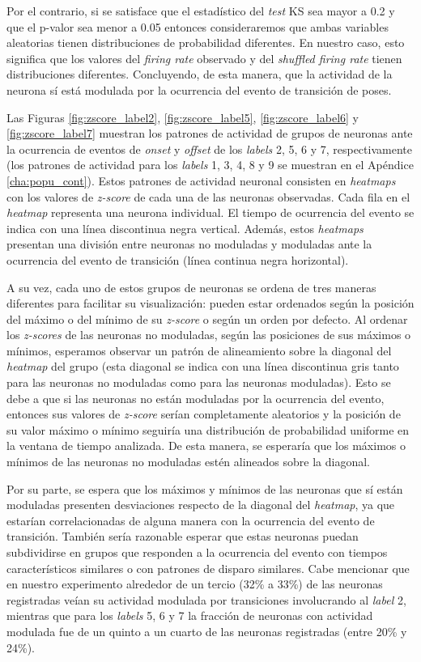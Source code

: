 Por el contrario, si se satisface que el estadístico del \textit{test} KS sea mayor a 0.2 y que el p-valor sea menor a 0.05 entonces consideraremos que ambas variables aleatorias tienen distribuciones de probabilidad diferentes. En nuestro caso, esto significa que los valores del \textit{firing rate} observado y del \textit{shuffled firing rate} tienen distribuciones diferentes. Concluyendo, de esta manera, que la actividad de la neurona sí está modulada por la ocurrencia del evento de transición de poses.

Las Figuras \ref{fig:zscore_label2}, \ref{fig:zscore_label5}, \ref{fig:zscore_label6} y \ref{fig:zscore_label7} muestran los patrones de actividad de grupos de neuronas ante la ocurrencia de eventos de \textit{onset} y \textit{offset} de los \textit{labels} 2, 5, 6 y 7, respectivamente (los patrones de actividad para los \textit{labels} 1, 3, 4, 8 y 9 se muestran en el Apéndice \ref{cha:popu_cont}). Estos patrones de actividad neuronal consisten en \textit{heatmaps} con los valores de \textit{z-score} de cada una de las neuronas observadas. Cada fila en el \textit{heatmap} representa una neurona individual. El tiempo de ocurrencia del evento se indica con una línea discontinua negra vertical. Además, estos \textit{heatmaps} presentan una división entre neuronas no moduladas y moduladas ante la ocurrencia del evento de transición (línea continua negra horizontal).

A su vez, cada uno de estos grupos de neuronas se ordena de tres maneras diferentes para facilitar su visualización: pueden estar ordenados según la posición del máximo o del mínimo de su \textit{z-score} o según un orden por defecto. Al ordenar los \textit{z-scores} de las neuronas no moduladas, según las posiciones de sus máximos o mínimos, esperamos observar un patrón de alineamiento sobre la diagonal del \textit{heatmap} del grupo (esta diagonal se indica con una línea discontinua gris tanto para las neuronas no moduladas como para las neuronas moduladas). Esto se debe a que si las neuronas no están moduladas por la ocurrencia del evento, entonces sus valores de \textit{z-score} serían completamente aleatorios y la posición de su valor máximo o mínimo seguiría una distribución de probabilidad uniforme en la ventana de tiempo analizada. De esta manera, se esperaría que los máximos o mínimos de las neuronas no moduladas estén alineados sobre la diagonal.

Por su parte, se espera que los máximos y mínimos de las neuronas que sí están moduladas presenten desviaciones respecto de la diagonal del \textit{heatmap}, ya que estarían correlacionadas de alguna manera con la ocurrencia del evento de transición. También sería razonable esperar que estas neuronas puedan subdividirse en grupos que responden a la ocurrencia del evento con tiempos característicos similares o con patrones de disparo similares. Cabe mencionar que en nuestro experimento alrededor de un tercio (32\% a 33\%) de las neuronas registradas veían su actividad modulada por transiciones involucrando al \textit{label} 2, mientras que para los \textit{labels} 5, 6 y 7 la fracción de neuronas con actividad modulada fue de un quinto a un cuarto de las neuronas registradas (entre 20\% y 24\%).

